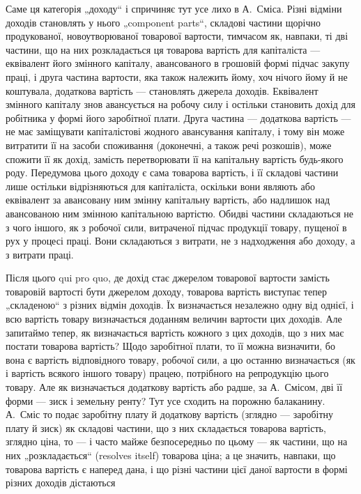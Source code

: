 Саме ця категорія „доходу“ і спричиняє тут усе лихо в А.~Сміса.
Різні відміни доходів становлять у нього „component parts“, складові
частини щорічно продукованої, новоутворюваної товарової вартости, тимчасом
як, навпаки, ті дві частини, що на них розкладається ця товарова
вартість для капіталіста — еквівалент його змінного капіталу, авансованого
в грошовій формі підчас закупу праці, і друга частина вартости, яка також
належить йому, хоч нічого йому й не коштувала, додаткова вартість —
становлять джерела доходів. Еквівалент змінного капіталу знов авансується
на робочу силу і остільки становить дохід для робітника у формі його
заробітної плати. Друга частина — додаткова вартість — не має заміщувати
капіталістові жодного авансування капіталу, і тому він може витратити її
на засоби споживання (доконечні, а також речі розкошів), може спожити її
як дохід, замість перетворювати її на капітальну вартість будь-якого роду.
Передумова цього доходу є сама товарова вартість, і її складові частини
лише остільки відрізняються для капіталіста, оскільки вони являють або
еквівалент за авансовану ним змінну капітальну вартість, або надлишок
над авансованою ним змінною капітальною вартістю. Обидві частини складаються
не з чого іншого, як з робочої сили, витраченої підчас продукції
товару, пущеної в рух у процесі праці. Вони складаються з витрати,
не з надходження або доходу, а з витрати праці.

Після цього qui pro quo, де дохід стає джерелом товарової вартости
замість товаровій вартості бути джерелом доходу, товарова
вартість виступає тепер „складеною“ з різних відмін доходів. Їх
визначається незалежно одну від однієї, і всю вартість товару визначається
доданням величин вартости цих доходів. Але запитаймо тепер,
як визначається вартість кожного з цих доходів, що з них має постати
товарова вартість? Щодо заробітної плати, то її можна визначити, бо вона
є вартість відповідного товару, робочої сили, а цю останню визначається
(як і вартість всякого іншого товару) працею, потрібного на репродукцію
цього товару. Але як визначається додаткову вартість або радше, за А.~Смісом, дві її форми — зиск і земельну ренту? Тут усе сходить на порожню
балаканину. А.~Сміс то подає заробітну плату й додаткову вартість
(зглядно — заробітну плату й зиск) як складові частини, що з них складається
товарова вартість, зглядно ціна, то — і часто майже безпосередньо
по цьому — як частини, що на них „розкладається“ (resolves itself) товарова
ціна; а це значить, навпаки, що товарова вартість є наперед дана,
і що різні частини цієї даної вартости в формі різних доходів дістаються
\parbreak{}  %

